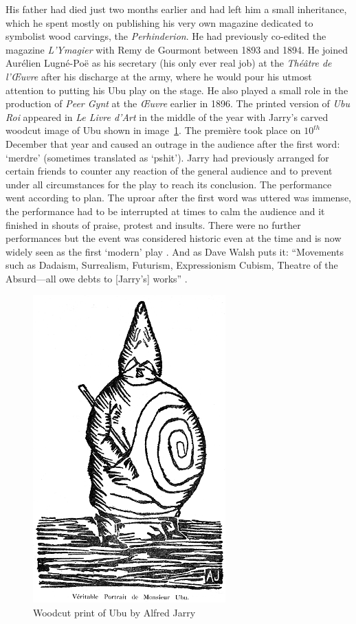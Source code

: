 His father had died just two months earlier and had left him a small inheritance, which he spent mostly on publishing his very own magazine dedicated to symbolist wood carvings, the \textit{Perhinderion}. He had previously co-edited the magazine \textit{L'Ymagier} with Remy de Gourmont between 1893 and 1894. He joined Aurélien Lugné-Poë as his secretary (his only ever real job) at the \textit{Théâtre de l'Œuvre} after his discharge at the army, where he would pour his utmost attention to putting his Ubu play on the stage. He also played a small role in the production of \textit{Peer Gynt} at the \textit{Œuvre} earlier in 1896. The printed version of \textit{Ubu Roi} appeared in \textit{Le Livre d'Art} in the middle of the year with Jarry's carved woodcut image of Ubu shown in image~\ref{img:UBU}. The première took place on $10^{th}$ December that year and caused an outrage in the audience after the first word: `merdre' (sometimes translated as `pshit'). Jarry had previously arranged for certain friends to counter any reaction of the general audience and to prevent under all circumstances for the play to reach its conclusion. The performance went according to plan. The uproar after the first word was uttered was immense, the performance had to be interrupted at times to calm the audience and it finished in shouts of praise, protest and insults. There were no further performances but the event was considered historic even at the time and is now widely seen as the first `modern' play \autocite{Brotchie2011a}. And as Dave Walsh puts it: ``Movements such as Dadaism, Surrealism, Futurism, Expressionism Cubism, Theatre of the Absurd---all owe debts to [Jarry's] works'' \autocite*{Walsh2001}.

\begin{figure}[!htbp] %
  \centering
  \includegraphics[height=0.6\textheight]{images/ubu}
  \caption[Woodcut print of Ubu]{Woodcut print of Ubu by Alfred Jarry}
\label{img:UBU}
\end{figure}

